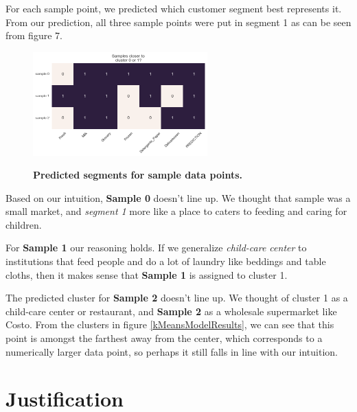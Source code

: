 \documentclass[twoside,openright,titlepage,numbers=noenddot,headinclude,%
               footinclude=true,cleardoublepage=empty,abstractoff,BCOR=5mm,%
               paper=a4,fontsize=11pt,ngerman,american]{scrreprt}
\numberwithin{theorem}{chapter}
\numberwithin{definition}{chapter}
\numberwithin{algorithm}{chapter}
\numberwithin{figure}{chapter}
\numberwithin{table}{chapter}
\numberwithin{equation}{chapter}
\begin{document}
For each sample point, we predicted which customer segment best represents it. From our prediction, all three sample points were put in segment 1 as can be seen from figure 7. 

\begin{figure}[!hbtp]
\centering
    
    \includegraphics[width=0.6\textwidth]{figures/samplePointSegment}
    \label{samplePointSegment}
    
    \caption{\textbf{Predicted segments for sample data points.}}
\end{figure}

Based on our intuition, \textbf{Sample 0} doesn't line up. We thought that sample was a small market, and \emph{segment 1} more like a place to caters to feeding and caring for children.

For \textbf{Sample 1} our reasoning holds. If we generalize \emph{child-care center} to institutions that feed people and do a lot of laundry like beddings and table cloths, then it makes sense that \textbf{Sample 1} is assigned to cluster 1.

The predicted cluster for \textbf{Sample 2} doesn't line up. We thought of cluster 1 as a child-care center or restaurant, and \textbf{Sample 2} as a wholesale supermarket like Costo. From the clusters in figure \ref{kMeansModelResults}, we can see that this point is amongst the farthest away from the center, which corresponds to a numerically larger data point, so perhaps it still falls in line with our intuition.


\section*{Justification}


\end{document}
